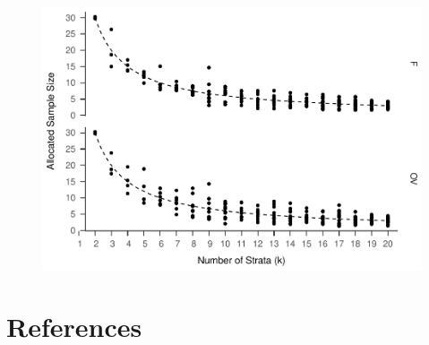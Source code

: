 \documentclass[floatsintext,man]{apa6}
\theoremstyle{definition}
\theoremstyle{definition}
\theoremstyle{definition}
\theoremstyle{remark}
\begin{document}
\begin{figure}
\centering
\includegraphics{Method_files/figure-latex/k-size-full-1.pdf}
\caption{}
\end{figure}

\newpage

\section{References}\label{references}

\begingroup
\setlength{\parindent}{-0.5in} \setlength{\leftskip}{0.5in}

\hypertarget{refs}{}

\endgroup
\end{document}
